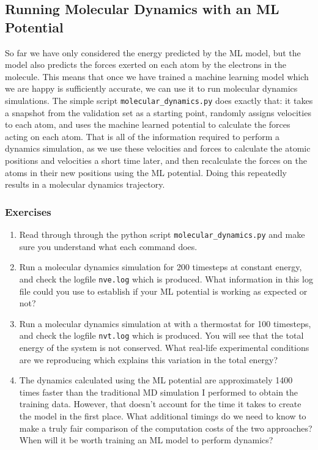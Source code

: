 \documentclass{article}
\begin{document}
\subsection{Running Molecular Dynamics with an ML Potential}
\label{sec:md}

So far we have only considered the energy predicted by the ML model, but the model also predicts the forces exerted on each atom by the electrons in the molecule. This means that once we have trained a machine learning model which we are happy is sufficiently accurate, we can use it to run molecular dynamics simulations. The simple script \verb|molecular_dynamics.py| does exactly that: it takes a snapshot from the validation set as a starting point, randomly assigns velocities to each atom, and uses the machine learned potential to calculate the forces acting on each atom. That is all of the information required to perform a dynamics simulation, as we use these velocities and forces to calculate the atomic positions and velocities a short time later, and then recalculate the forces on the atoms in their new positions using the ML potential. Doing this repeatedly results in a molecular dynamics trajectory.

\subsubsection*{Exercises}

\begin{enumerate}

\item Read through through the python script \verb|molecular_dynamics.py| and make sure you understand what each command does.
\item Run a molecular dynamics simulation for 200 timesteps at constant energy, and check the logfile \verb|nve.log| which is produced. What information in this log file could you use to establish if your ML potential is working as expected or not?
\item Run a molecular dynamics simulation at with a thermostat for 100 timesteps, and check the logfile \verb|nvt.log| which is produced. You will see that the total energy of the system is not conserved. What real-life experimental conditions are we reproducing which explains this variation in the total energy?
\item The dynamics calculated using the ML potential are approximately 1400 times faster than the traditional MD simulation I performed to obtain the training data. However, that doesn't account for the time it takes to create the model in the first place. What additional timings do we need to know to make a truly fair comparison of the computation costs of the two approaches? When will it be worth training an ML model to perform dynamics?

\end{enumerate}
\end{document}

